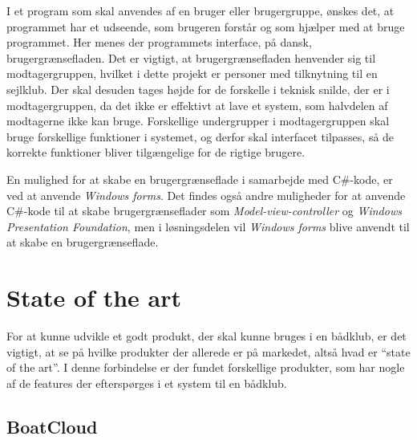 I et program som skal anvendes af en bruger eller brugergruppe, ønskes det, at programmet har et udseende, som brugeren
forstår og som hjælper med at bruge programmet. Her menes der programmets interface, på dansk, brugergrænsefladen. Det
er vigtigt, at brugergrænsefladen henvender sig til modtagergruppen, hvilket i dette projekt er personer med tilknytning
til en sejlklub. Der skal desuden tages højde for de forskelle i teknisk snilde, der er i modtagergruppen, da det ikke er
effektivt at lave et system, som halvdelen af modtagerne ikke kan bruge. Forskellige undergrupper i modtagergruppen skal
bruge forskellige funktioner i systemet, og derfor skal interfacet tilpasses, så de korrekte funktioner bliver
tilgængelige for de rigtige brugere.


En mulighed for at skabe en brugergrænseflade i samarbejde med C\#-kode, er ved at anvende \textit{Windows forms}.
Det findes også andre muligheder for at anvende C\#-kode til at skabe brugergrænseflader som
\textit{Model-view-controller} og \textit{Windows Presentation Foundation}, men i løsningsdelen vil \textit{Windows
forms} blive anvendt til at skabe en brugergrænseflade.  


\section{State of the art}

For at kunne udvikle et godt produkt, der skal kunne bruges i en bådklub, er det vigtigt, at se på hvilke
produkter der allerede er på markedet, altså hvad er ``state of the art''. I denne forbindelse er der fundet
forskellige produkter, som har nogle af de features der efterspørges i et system til en bådklub. 



\subsection*{BoatCloud}

